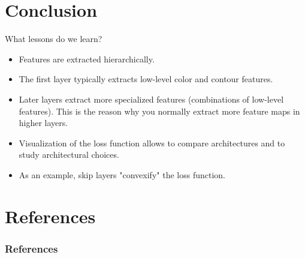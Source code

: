 \documentclass[xcolor=pdftex,dvipsnames,table]{beamer}
\begin{document}
\section{Conclusion}

\begin{frame}{What lessons do we learn?}
	\begin{itemize}
		\item Features are extracted hierarchically. 
		\item The first layer typically extracts low-level color and contour features.
		\item Later layers extract more specialized features (combinations of low-level features). This is the reason why you normally extract more feature maps in higher layers.
		\item Visualization of the loss function allows to compare architectures and to study architectural choices. 
		\item As an example, skip layers "convexify" the loss function.
	\end{itemize}
\end{frame}

\section{References}
\begin{frame}[allowframebreaks]
	\frametitle{References}
	
\end{frame}
\end{document}
